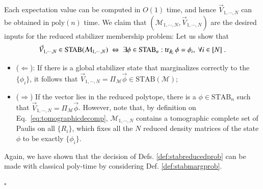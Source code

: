 \documentclass[10pt,aps,pra,twocolumn,floatfix,nofootinbib,superscriptaddress,longbibliography]{revtex4-2}
\newcommand{\1}{\mathbbm{1}}
\begin{document}
\begin{enumerate}
Each expectation value can be computed in $O(1)$ time, and hence $\vec V_{1, \cdots,N}$ can be obtained in $\mathrm{poly}(n)$ time. We claim that $(\mathcal M_{1,\cdots, N}, \vec{V}_{1, \cdots, N})$ are the desired inputs for the reduced stabilizer membership problem: Let us show that
\begin{equation}
    \vec V_{1,\cdots, N} \in \mathrm{STAB}(\mathcal  M_{1,\cdots, N})\; \Leftrightarrow \; \exists \phi \in \mathrm{STAB}_n:\tr_{\bar{R}_i}\phi =\phi_i, \;\forall i \in [N]\;.
\end{equation}
\begin{itemize}
    \item ($\Leftarrow$): If there is a global stabilizer state that marginalizes correctly to the $\{\phi_i\}$, it follows that $\vec V_{1,\cdots, N} = \Pi_\mathcal M \vec{\phi} \in \mathrm{STAB}(\mathcal M)$;
    \item ($\Rightarrow$) If the vector lies in the reduced polytope, there is a $\phi \in \mathrm{STAB}_n$ such that $\vec V_{1, \cdots, N} =\Pi_\mathcal M \vec{\phi}$. However, note that, by definition on Eq.~\eqref{eq:tomographicdecomp}, $\mathcal  M_{1,\cdots, N}$ contains a tomographic complete set of Paulis on all $\{R_i\}$, which fixes all the $N$ reduced density matrices of the state $\phi$ to be exactly $\{\phi_i\}$. 
\end{itemize}
Again, we have shown that the decision of Defs. \ref{def:stabreducedprob} can be made with classical poly-time by considering Def. \ref{def:stabmargprob}. 
\end{enumerate}
$\square$
\end{document}
